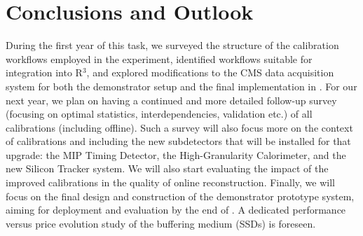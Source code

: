 \chapter{Conclusions and Outlook} \label{sec:conclusions_and_outlook}

During the first year of this task, 
we surveyed the structure of the calibration workflows employed in the experiment, 
identified workflows suitable for integration into R$^3$, 
and explored modifications to the CMS data acquisition system for both the demonstrator setup and the final implementation in \Phasetwo.
For our next year, we plan on having a continued and more detailed follow-up survey (focusing on optimal statistics, interdependencies, validation etc.) of all calibrations (including offline). Such a survey will also focus more on the context of \Phasetwo calibrations and including the new subdetectors that will be installed for that upgrade: 
the MIP Timing Detector,
the High-Granularity Calorimeter,
and the new Silicon Tracker system.
We will also start evaluating the impact of the improved calibrations in the quality of online reconstruction.
Finally, we will focus on the final design and construction of the demonstrator prototype system, aiming for deployment and evaluation by the end of \Runthree. 
A dedicated performance versus price evolution study of the buffering medium (SSDs) is foreseen.
